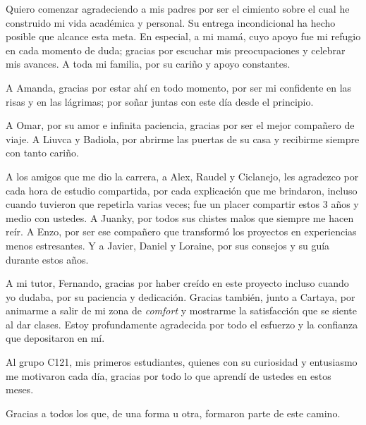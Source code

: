 \begin{acknowledgements}
    Quiero comenzar agradeciendo a mis padres por ser el cimiento sobre el cual he construido mi vida académica y personal. Su entrega incondicional ha hecho posible que alcance esta meta. En especial, a mi mamá, cuyo apoyo fue mi refugio en cada momento de duda; gracias por escuchar mis preocupaciones y celebrar mis avances. A toda mi familia, por su cariño y apoyo constantes.

    A Amanda, gracias por estar ahí en todo momento, por ser mi confidente en las risas y en las lágrimas; por soñar juntas con este día desde el principio.

    A Omar, por su amor e infinita paciencia, gracias por ser el mejor compañero de viaje. A Liuvca y Badiola, por abrirme las puertas de su casa y recibirme siempre con tanto cariño.

    A los amigos que me dio la carrera, a Alex, Raudel y Ciclanejo, les agradezco por cada hora de estudio compartida, por cada explicación que me brindaron, incluso cuando tuvieron que repetirla varias veces; fue un placer compartir estos 3 años y medio con ustedes. A Juanky, por todos sus chistes malos que siempre me hacen reír. A Enzo, por ser ese compañero que transformó los proyectos en experiencias menos estresantes. Y a Javier, Daniel y Loraine, por sus consejos y su guía durante estos años.

    A mi tutor, Fernando, gracias por haber creído en este proyecto incluso cuando yo dudaba, por su paciencia y dedicación. Gracias también, junto a Cartaya, por animarme a salir de mi zona de \textit{comfort} y mostrarme la satisfacción que se siente al dar clases. Estoy profundamente agradecida por todo el esfuerzo y la confianza que depositaron en mí.

    Al grupo C121, mis primeros estudiantes, quienes con su curiosidad y entusiasmo me motivaron cada día, gracias por todo lo que aprendí de ustedes en estos meses.

    Gracias a todos los que, de una forma u otra, formaron parte de este camino.
\end{acknowledgements}